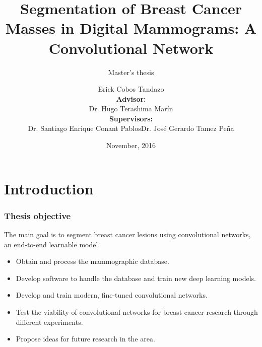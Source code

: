 \documentclass{beamer}
\title[Thesis Dissertation]{Segmentation of Breast Cancer Masses in Digital Mammograms: A Convolutional Network}
\subtitle{Master's thesis}
\author[Erick Cobos]{Erick Cobos Tandazo \\ \medskip \footnotesize \textbf{Advisor:}\\Dr. Hugo Terashima Marín \\ \textbf{Supervisors:}\\Dr. Santiago Enrique Conant Pablos\hfill Dr. José Gerardo Tamez Peña}
\date[November, 2016]{November, 2016}
\institute[Tec de Monterrey]{
    Centro de Sistemas Intelligentes \\ Tecnologico de Monterrey}
\begin{document}
	\begin{frame}
		\titlepage
	\end{frame}
		
    \section[Introduction]{Introduction}
    \begin{frame}
		\frametitle{Thesis objective}
			The main goal is to segment breast cancer lesions using convolutional networks, an end-to-end learnable model.
		
		\begin{itemize}
			\item Obtain and process the mammographic database. %
			\item Develop software to handle the database and train new deep learning models.
			\item Develop and train modern, fine-tuned convolutional networks.%
			\item Test the viability of convolutional networks for breast cancer research through different experiments.
			\item Propose ideas for future research in the area.
		\end{itemize}
	\end{frame}
   

    
\end{document}
